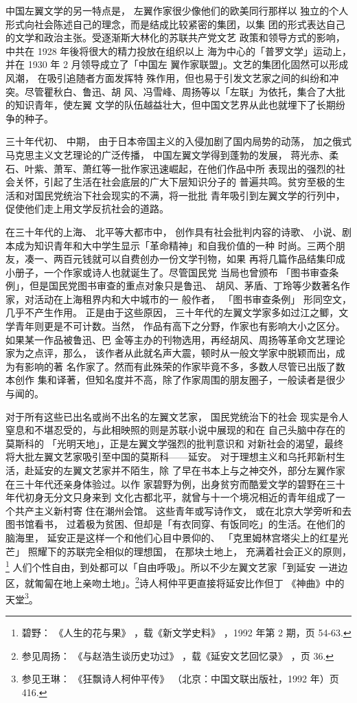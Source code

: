 中国左翼文学的另一特点是，
左翼作家很少像他们的欧美同行那样以
独立的个人形式向社会陈述自己的理念，而是结成比较紧密的集团，以集
团的形式表达自己的文学和政治主张。受逐渐斯大林化的苏联共产党文艺
政策和领导方式的影响，中共在 1928 年後将很大的精力投放在组织以上
海为中心的「普罗文学」运动上，并在 1930 年 2 月领导成立了「中国左
翼作家联盟」。文艺的集团化固然可以形成风潮，
在吸引追随者方面发挥特
殊作用，但也易于引发文艺家之间的纠纷和冲突。尽管瞿秋白、鲁迅、胡
风、冯雪峰、周扬等以「左联」为依托，集合了大批的知识青年，使左翼
文学的队伍越益壮大，但中国文艺界从此也就埋下了长期纷争的种子。
 
三十年代初、
中期，
由于日本帝国主义的入侵加剧了国内局势的动荡，
加之俄式马克思主义文艺理论的广泛传播，
中国左翼文学得到蓬勃的发展，
蒋光赤、柔石、叶紫、萧军、萧红等一批作家迅速崛起，在他们作品中所
表现出的强烈的社会关怀，引起了生活在社会底层的广大下层知识分子的
普遍共鸣。贫穷至极的生活和对国民党统治下社会现实的不满，将一批批
青年吸引到左翼文学的行列中，促使他们走上用文学反抗社会的道路。

在三十年代的上海、
北平等大都市中，
创作具有社会批判内容的诗歌、
小说、剧本成为知识青年和大中学生显示「革命精神」和自我价值的一种
时尚。三两个朋友，凑一、两百元钱就可以自费创办一份文学刊物，如果
再将几篇作品结集印成小册子，一个作家或诗人也就诞生了。尽管国民党
当局也曾颁布
「图书审查条例」，但是国民党图书审查的重点对象只是鲁迅、
胡风、茅盾、丁玲等少数著名作家，对活动在上海租界内和大中城市的一
般作者，
「图书审查条例」
形同空文，
几乎不产生作用。
正是由于这些原因，
三十年代的左翼文学家多如过江之鲫，文学青年则更是不可计数。当然，
作品有高下之分野，作家也有影响大小之区分。如果某一作品被鲁迅、巴
金等主办的刊物选用，再经胡风、周扬等革命文艺理论家为之点评，那么，
该作者从此就名声大震，顿时从一般文学家中脱颖而出，成为有影响的著
名作家了。然而有此殊荣的作家毕竟不多，多数人尽管已出版了数本创作
集和译著，但知名度并不高，除了作家周围的朋友圈子，一般读者是很少
与闻的。

对于所有这些已出名或尚不出名的左翼文艺家，
国民党统治下的社会
现实是令人窒息和不堪忍受的，与此相映照的则是苏联小说中展现的和在
自己头脑中存在的莫斯科的
「光明天地」，正是左翼文学强烈的批判意识和
对新社会的渴望，最终将大批左翼文艺家吸引至中国的莫斯科——延安。
对于理想主义和乌托邦新村生活，赴延安的左翼文艺家并不陌生，除
了早在书本上与之神交外，部分左翼作家在三十年代还亲身体验过。以作
家碧野为例，出身贫穷而酷爱文学的碧野在三十年代初身无分文只身来到
文化古都北平，就曾与十一个境况相近的青年组成了一个共产主义新村寄
住在潮州会馆。
这些青年或写诗作文，
或在北京大学旁听和去图书馆看书，
过着极为贫困、但却是「有衣同穿、有饭同吃」的生活。在他们的脑海里，
延安正是这样一个和他们心目中景仰的、
「克里姆林宫塔尖上的红星光芒」
照耀下的苏联完全相似的理想国，
在那块土地上，
充满着社会正义的原则，
\footnote{碧野：
《人生的花与果》
，载《新文学史料》
，1992 年第 2 期，页 54-63.}
人们个性自由，到处都可以「自由呼吸」。所以不少左翼文艺家「到延安
一进边区，就匍匐在地上亲吻土地」。\footnote{参见周扬：
《与赵浩生谈历史功过》
，载《延安文艺回忆录》
，页 36.}诗人柯仲平更直接将延安比作但丁
《神曲》中的天堂\footnote{参见王琳：
《狂飘诗人柯仲平传》
（北京：中国文联出版社，1992 年）页 416.}。

